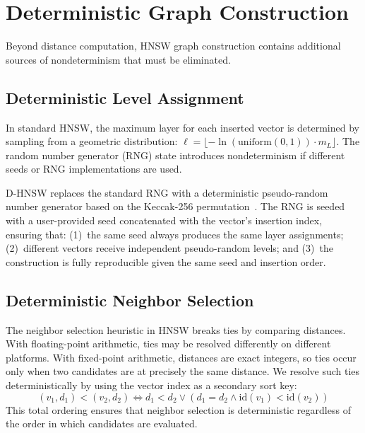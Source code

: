\documentclass[10pt,journal,compsoc]{IEEEtran}
\newcommand{\dhnsw}{\textsc{D-HNSW}}
\newcommand{\hnsw}{\textsc{HNSW}}
\begin{document}
\section{Deterministic Graph Construction}
\label{sec:construction}

Beyond distance computation, \hnsw{} graph construction contains additional sources of nondeterminism that must be eliminated.

\subsection{Deterministic Level Assignment}

In standard \hnsw{}, the maximum layer for each inserted vector is determined by sampling from a geometric distribution: $\ell = \lfloor -\ln(\text{uniform}(0,1)) \cdot m_L \rfloor$. The random number generator (RNG) state introduces nondeterminism if different seeds or RNG implementations are used.

\dhnsw{} replaces the standard RNG with a deterministic pseudo-random number generator based on the Keccak-256 permutation~\cite{bertoni2013keccak}. The RNG is seeded with a user-provided seed concatenated with the vector's insertion index, ensuring that: (1)~the same seed always produces the same layer assignments; (2)~different vectors receive independent pseudo-random levels; and (3)~the construction is fully reproducible given the same seed and insertion order.

\subsection{Deterministic Neighbor Selection}

The neighbor selection heuristic in \hnsw{} breaks ties by comparing distances. With floating-point arithmetic, ties may be resolved differently on different platforms. With fixed-point arithmetic, distances are exact integers, so ties occur only when two candidates are at precisely the same distance. We resolve such ties deterministically by using the vector index as a secondary sort key:
\begin{equation}
  (v_1, d_1) < (v_2, d_2) \iff d_1 < d_2 \lor (d_1 = d_2 \land \text{id}(v_1) < \text{id}(v_2))
\end{equation}
This total ordering ensures that neighbor selection is deterministic regardless of the order in which candidates are evaluated.
\end{document}
